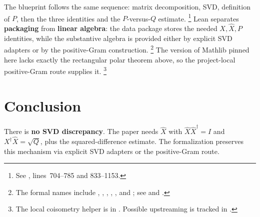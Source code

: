 \documentclass[11pt]{article}
\begin{document}
The blueprint follows the same sequence: matrix decomposition, SVD, definition of
$P$, then the three identities and the $P$-versus-$Q$ estimate.%
\footnote{See , lines~704--785
and 833--1153.}
Lean separates \textbf{packaging} from \textbf{linear algebra}: the data package
stores the needed $X,\widehat X,P$ identities, while the substantive algebra is
provided either by explicit SVD adapters or by the positive-Gram construction.%
\footnote{The formal names include , ,
,
,
, and
; see
 and
.}
The version of Mathlib pinned here lacks exactly the rectangular polar theorem
above, so the project-local positive-Gram route supplies it.%
\footnote{The local coisometry helper
 is in
.  Possible upstreaming is tracked
in .}

\section{Conclusion}

There is \textbf{no SVD discrepancy}.  The paper needs $\widehat X$ with
$\widehat X\widehat X^\dagger=I$ and $X^\dagger\widehat X=\sqrt Q$, plus the
squared-difference estimate.  The formalization preserves this mechanism via
explicit SVD adapters or the positive-Gram route.



\end{document}
